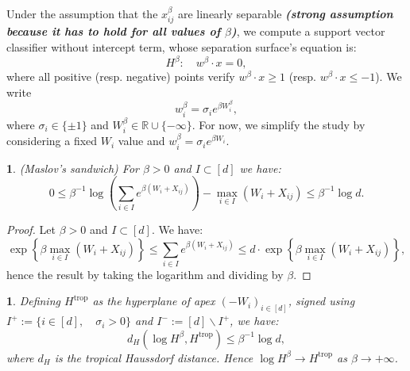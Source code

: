 \documentclass[oneside,english]{amsart}
\numberwithin{equation}{section}
\numberwithin{figure}{section}
\theoremstyle{plain}
\theoremstyle{definition}
\theoremstyle{plain}
\newtheorem{prop}[thm]{\protect\propositionname}
\theoremstyle{remark}
\theoremstyle{plain}
\newtheorem{lem}[thm]{\protect\lemmaname}
\theoremstyle{definition}
\theoremstyle{definition}
\providecommand{\lemmaname}{Lemma}
\providecommand{\propositionname}{Proposition}
\begin{document}
Under the assumption that the $x_{ij}^{\beta}$ are linearly separable
\textbf{\emph{(strong assumption because it has to hold for all values
of $\beta$)}}, we compute a support vector classifier without intercept
term, whose separation surface's equation is: 
\[
H^{\beta}:\quad w^{\beta}\cdot x=0,
\]
where all positive (resp. negative) points verify $w^{\beta}\cdot x\ge1$
(resp. $w^{\beta}\cdot x\le-1$). We write 
\[
w_{i}^{\beta}=\sigma_{i}e^{\beta W_{i}^{\beta}},
\]
where $\sigma_{i}\in\{\pm1\}$ and $W_{i}^{\beta}\in\mathbb{R}\cup\{-\infty\}$.
For now, we simplify the study by considering a fixed $W_{i}$ value
and $w_{i}^{\beta}=\sigma_{i}e^{\beta W_{i}}$. 
\begin{lem}
(Maslov's sandwich) For $\beta>0$ and $I\subset[d]$ we have: 
\[
0\leq\beta^{-1}\log\left(\sum_{i\in I}e^{\beta(W_{i}+X_{ij})}\right)-\max_{i\in I}(W_{i}+X_{ij})\le\beta^{-1}\log d.
\]
\end{lem}

\begin{proof}
Let $\beta>0$ and $I\subset[d]$. We have: 
\[
\exp\left\{ \beta\max_{i\in I}\left(W_{i}+X_{ij}\right)\right\} \le\sum_{i\in I}e^{\beta(W_{i}+X_{ij})}\le d\cdot\exp\left\{ \beta\max_{i\in I}\left(W_{i}+X_{ij}\right)\right\} ,
\]
hence the result by taking the logarithm and dividing by $\beta$. 
\end{proof}
\begin{prop}
Defining $H^{\text{trop}}$ as the hyperplane of apex $(-W_{i})_{i\in[d]}$,
signed using $I^{+}:=\{i\in[d],\quad\sigma_{i}>0\}$ and $I^{-}:=[d]\backslash I^{+}$,
we have: 
\[
d_{H}\left(\log H^{\beta},H^{\text{trop}}\right)\le\beta^{-1}\log d,
\]
where $d_{H}$ is the tropical Haussdorf distance. Hence $\log H^{\beta}\longrightarrow H^{\text{trop}}$
as $\beta\longrightarrow+\infty$. 
\end{prop}
\end{document}
